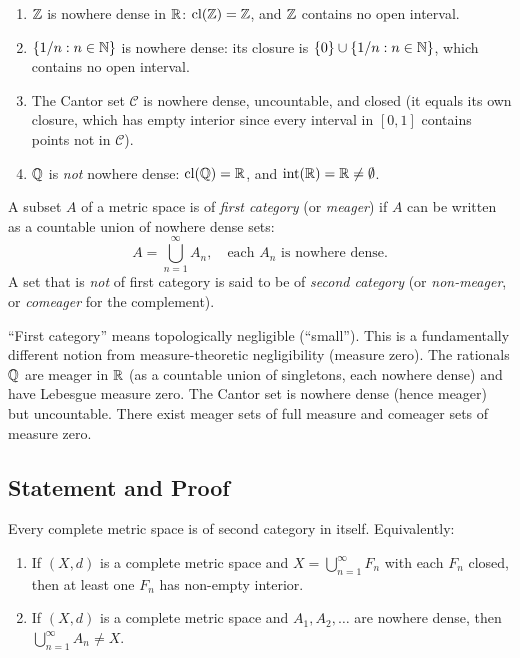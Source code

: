 \documentclass[11pt,a4paper]{article}
\begin{document}
\begin{example}
\label{ex:nowhere_dense}
\begin{enumerate}[label=(\alph*),nosep]
    \item $\mathbb{Z}$ is nowhere dense in $\mathbb{R}$: $\operatorname{cl}(\mathbb{Z}) = \mathbb{Z}$, and $\mathbb{Z}$ contains
          no open interval.
    \item $\{1/n : n \in \mathbb{N}\}$ is nowhere dense: its closure is
          $\{0\} \cup \{1/n : n \in \mathbb{N}\}$, which contains no open interval.
    \item The Cantor set $\mathcal{C}$ is nowhere dense, uncountable, and
          closed (it equals its own closure, which has empty interior since
          every interval in $[0,1]$ contains points not in $\mathcal{C}$).
    \item $\mathbb{Q}$ is \emph{not} nowhere dense: $\operatorname{cl}(\mathbb{Q}) = \mathbb{R}$, and
          $\operatorname{int}(\mathbb{R}) = \mathbb{R} \ne \emptyset$.
\end{enumerate}
\end{example}

\begin{definition}
\label{def:category}
A subset $A$ of a metric space is of \emph{first category} (or
\emph{meager}) if $A$ can be written as a countable union of nowhere dense
sets:
\[
A = \bigcup_{n=1}^\infty A_n, \quad
\text{each } A_n \text{ is nowhere dense.}
\]
A set that is \emph{not} of first category is said to be of \emph{second
category} (or \emph{non-meager}, or \emph{comeager} for the complement).
\end{definition}

\begin{remark}
\label{rem:category_vs_measure}
``First category'' means topologically negligible (``small''). This is a
fundamentally different notion from measure-theoretic negligibility (measure
zero). The rationals $\mathbb{Q}$ are meager in $\mathbb{R}$ (as a countable union of
singletons, each nowhere dense) and have Lebesgue measure zero. The Cantor
set is nowhere dense (hence meager) but uncountable. There exist meager sets
of full measure and comeager sets of measure zero.
\end{remark}

\subsection{Statement and Proof}

\begin{theorem}
\label{thm:baire}
Every complete metric space is of second category in itself. Equivalently:
\begin{enumerate}[label=(\alph*),nosep]
    \item If $(X,d)$ is a complete metric space and
          $X = \bigcup_{n=1}^\infty F_n$ with each $F_n$ closed, then at
          least one $F_n$ has non-empty interior.
    \item If $(X,d)$ is a complete metric space and $A_1, A_2, \ldots$ are
          nowhere dense, then $\bigcup_{n=1}^\infty A_n \ne X$.
\end{enumerate}
\end{theorem}
\end{document}
